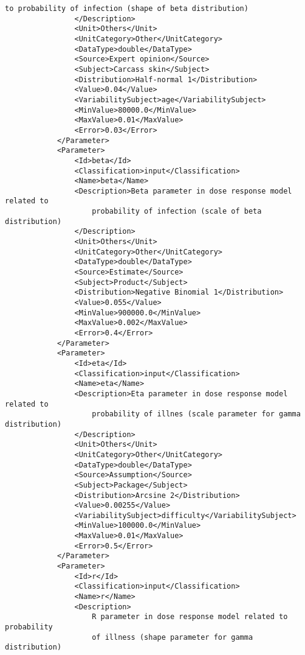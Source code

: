 \documentclass[a4paper]{report}
\begin{document}
\begin{lstlisting}[language=RAKIP, caption={Example of StudySample}]
                    to probability of infection (shape of beta distribution)
                </Description>
                <Unit>Others</Unit>
                <UnitCategory>Other</UnitCategory>
                <DataType>double</DataType>
                <Source>Expert opinion</Source>
                <Subject>Carcass skin</Subject>
                <Distribution>Half-normal 1</Distribution>
                <Value>0.04</Value>
                <VariabilitySubject>age</VariabilitySubject>
                <MinValue>80000.0</MinValue>
                <MaxValue>0.01</MaxValue>
                <Error>0.03</Error>
            </Parameter>
            <Parameter>
                <Id>beta</Id>
                <Classification>input</Classification>
                <Name>beta</Name>
                <Description>Beta parameter in dose response model related to
                    probability of infection (scale of beta distribution)
                </Description>
                <Unit>Others</Unit>
                <UnitCategory>Other</UnitCategory>
                <DataType>double</DataType>
                <Source>Estimate</Source>
                <Subject>Product</Subject>
                <Distribution>Negative Binomial 1</Distribution>
                <Value>0.055</Value>
                <MinValue>900000.0</MinValue>
                <MaxValue>0.002</MaxValue>
                <Error>0.4</Error>
            </Parameter>
            <Parameter>
                <Id>eta</Id>
                <Classification>input</Classification>
                <Name>eta</Name>
                <Description>Eta parameter in dose response model related to
                    probability of illnes (scale parameter for gamma distribution)
                </Description>
                <Unit>Others</Unit>
                <UnitCategory>Other</UnitCategory>
                <DataType>double</DataType>
                <Source>Assumption</Source>
                <Subject>Package</Subject>
                <Distribution>Arcsine 2</Distribution>
                <Value>0.00255</Value>
                <VariabilitySubject>difficulty</VariabilitySubject>
                <MinValue>100000.0</MinValue>
                <MaxValue>0.01</MaxValue>
                <Error>0.5</Error>
            </Parameter>
            <Parameter>
                <Id>r</Id>
                <Classification>input</Classification>
                <Name>r</Name>
                <Description>
                    R parameter in dose response model related to probability
                    of illness (shape parameter for gamma distribution)

\end{lstlisting}
\end{document}
